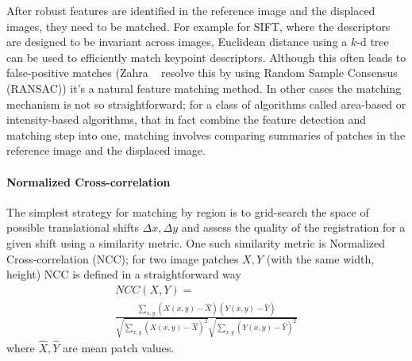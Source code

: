 After robust features are identified in the reference image and the displaced images, they need to be matched.
%
For example for SIFT, where the descriptors are designed to be invariant across images, Euclidean distance using a $k$-d tree can be used to efficiently match keypoint descriptors.
%
Although this often leads to false-positive matches (Zahra \etal~ resolve this by using Random Sample Consensus (RANSAC)) it's a natural feature matching method.
%
In other cases the matching mechanism is not so straightforward; for a class of algorithms called area-based or intensity-based algorithms, that in fact combine the feature detection and matching step into one, matching involves comparing summaries of patches in the reference image and the displaced image.

\paragraph{Normalized Cross-correlation}
The simplest strategy for matching by region is to grid-search the space of possible translational shifts $\Delta x, \Delta y$ and assess the quality of the registration for a given shift using a similarity metric.
%
One such similarity metric is Normalized Cross-correlation (NCC); for two image patches $X, Y$ (with the same width, height) NCC is defined in a straightforward way
\begin{multline}
    NCC(X, Y) = \\ \frac{\sum_{x,y} \left(X(x,y) - \hat{X}\right) \left(Y(x,y) - \hat{Y}\right)}{\sqrt{\sum_{x,y} \left(X(x,y) - \hat{X}\right)^2} \sqrt{ \sum_{x,y} \left(Y(x,y) - \hat{Y}\right)^2 }}
\end{multline}
where $\hat{X}, \hat{Y}$ are mean patch values.

